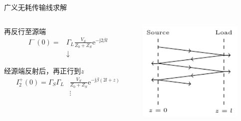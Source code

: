 \begin{frame}{广义无耗传输线求解}
  \begin{columns}
    \begin{column}{0.5\linewidth}
      \begin{center}
        再反行至源端
        \begin{align*}
          I^-(0)= & \Gamma_L\frac{V_S}{Z_0+Z_S}\mathrm{e}^{-\mathrm{j}2\beta l} \\
                  & \downarrow
        \end{align*}
      \end{center}

      \begin{center}
        经源端反射后，再正行到$z$
        \begin{align*}
          I_2^+(0)= \Gamma_S\Gamma_L & \frac{V_S}{Z_0+Z_S}\mathrm{e}^{-\mathrm{j}\beta(2l+z)} \\
                                     & \vdots
        \end{align*}
      \end{center}

    \end{column}
    \begin{column}{0.5\linewidth}
      \includegraphics[width=5cm]{Cha3//fig3-17.pdf}
    \end{column}
  \end{columns}

\end{frame}


